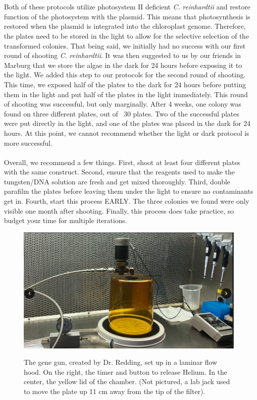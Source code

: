 \\ \\
Both of these protocols utilize photosystem II deficient \textit{C. reinhardtii} and restore function of the photosystem with the plasmid. This means that photosynthesis is restored when the plasmid is integrated into the chloroplast genome. Therefore, the plates need to be stored in the light to allow for the selective selection of the transformed colonies. That being said, we initially had no success with our first round of shooting \textit{C. reinhardtii}. It was then suggested to us by our friends in Marburg that we store the algae in the dark for 24 hours before exposing it to the light. We added this step to our protocols for the second round of shooting. This time, we exposed half of the plates to the dark for 24 hours before putting them in the light and put half of the plates in the light immediately. This round of shooting was successful, but only marginally. After 4 weeks, one colony was found on three different plates, out of ~30 plates. Two of the successful plates were put directly in the light, and one of the plates was placed in the dark for 24 hours. At this point, we cannot recommend whether the light or dark protocol is more successful. 
\\ \\
Overall, we recommend a few things. First, shoot at least four different plates with the same construct. Second, ensure that the reagents used to make the tungsten/DNA solution are fresh and get mixed thoroughly. Third, double parafilm the plates before leaving them under the light to ensure no contaminants get in. Fourth, start this process EARLY. The three colonies we found were only visible one month after shooting. Finally, this process does take practice, so budget your time for multiple iterations. 

\begin{figure}[!htbp]
    \centering
    \includegraphics[width=\textwidth]{images/chap3/algae/image2.png}
    \label{fig:ch3algae02}
    \caption{The gene gun, created by Dr. Redding, set up in a laminar flow hood. On the right, the timer and button to release Helium. In the center, the yellow lid of the chamber. (Not pictured, a lab jack used to move the plate up 11 cm away from the tip of the filter).} 
\end{figure}
\FloatBarrier



